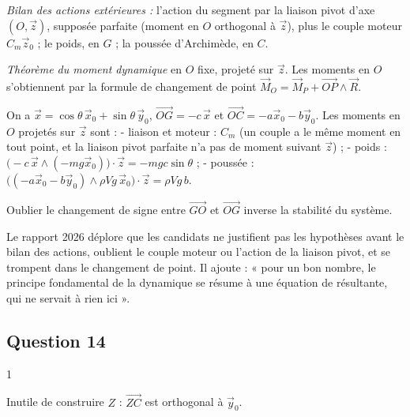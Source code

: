 \documentclass[11pt,a4paper]{article}
\newcommand{\equationajustee}[1]{%
  \sbox{\boiteequation}{$\displaystyle #1$}%
  \ifdim\wd\boiteequation>\linewidth
    \[\resizebox{\linewidth}{!}{\usebox{\boiteequation}}\]%
  \else
    \[#1\]%
  \fi}
\begin{document}
\emph{Bilan des actions extérieures :} l'action du segment par la liaison pivot d'axe \((O,\vec z)\), supposée parfaite (moment en \(O\) orthogonal à \(\vec z\)), plus le couple moteur \(C_m\vec z_0\) ; le poids, en \(G\) ; la poussée d'Archimède, en \(C\).

\emph{Théorème du moment dynamique} en \(O\) fixe, projeté sur \(\vec z\). Les moments en \(O\) s'obtiennent par la formule de changement de point \(\vec M_O=\vec M_P+\overrightarrow{OP}\wedge\vec R\).

On a \(\vec x=\cos\theta\,\vec x_0+\sin\theta\,\vec y_0\), \(\overrightarrow{OG}=-c\,\vec x\) et \(\overrightarrow{OC}=-a\vec x_0-b\vec y_0\). Les moments en \(O\) projetés sur \(\vec z\) sont :
- liaison et moteur : \(C_m\) (un couple a le même moment en tout point, et la liaison pivot parfaite n'a pas de moment suivant \(\vec z\)) ;
- poids : \(\big(-c\,\vec x\wedge(-mg\vec x_0)\big)\cdot\vec z=-mgc\sin\theta\) ;
- poussée : \(\big((-a\vec x_0-b\vec y_0)\wedge\rho Vg\,\vec x_0\big)\cdot\vec z=\rho Vg\,b\).

\equationajustee{\boxed{C_f\ddot\theta=C_m+\rho Vg\,b-mgc\sin\theta}}

\begin{piege}

Oublier le changement de signe entre \(\overrightarrow{GO}\) et \(\overrightarrow{OG}\) inverse la stabilité du système.

\end{piege}

\begin{jury}

Le rapport 2026 déplore que les candidats ne justifient pas les hypothèses avant le bilan des actions, oublient le couple moteur ou l'action de la liaison pivot, et se trompent dans le changement de point. Il ajoute : « pour un bon nombre, le principe fondamental de la dynamique se résume à une équation de résultante, qui ne servait à rien ici ».

\end{jury}

\hypertarget{question-14}{%
\subsection{Question 14}\label{question-14}}

\begin{indication}{1}

Inutile de construire \(Z\) : \(\overrightarrow{ZC}\) est orthogonal à \(\vec y_0\).

\end{indication}
\end{document}
